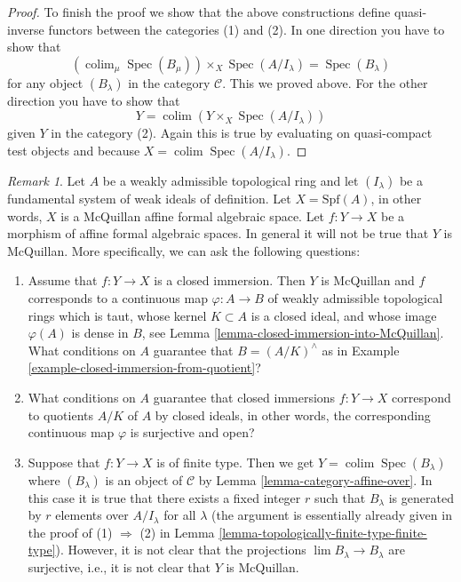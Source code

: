 \documentclass{stacks-project}
\theoremstyle{plain}
\theoremstyle{definition}
\theoremstyle{remark}
\newtheorem{remark}[subsection]{Remark}
\numberwithin{equation}{subsection}
\def\lim{\mathop{\mathrm{lim}}\nolimits}
\def\colim{\mathop{\mathrm{colim}}\nolimits}
\def\Spec{\mathop{\mathrm{Spec}}}
\begin{document}
\begin{proof}
\medskip\noindent
To finish the proof we show that the above constructions
define quasi-inverse functors between the categories (1) and (2).
In one direction you have to show that
$$
\left(\colim_\mu \Spec(B_\mu)\right) \times_X \Spec(A/I_\lambda) =
\Spec(B_\lambda)
$$
for any object $(B_\lambda)$ in the category $\mathcal{C}$.
This we proved above. For
the other direction you have to show that
$$
Y = \colim (Y \times_X \Spec(A/I_\lambda))
$$
given $Y$ in the category (2). Again this is true by evaluating on
quasi-compact test objects and because $X = \colim \Spec(A/I_\lambda)$.
\end{proof}

\begin{remark}
\label{remark-questions}
Let $A$ be a weakly admissible topological ring and let $(I_\lambda)$
be a fundamental system of weak ideals of definition. Let $X = \text{Spf}(A)$,
in other words, $X$ is a McQuillan affine formal algebraic space.
Let $f : Y \to X$ be a morphism of affine formal algebraic spaces.
In general it will not be true that $Y$ is McQuillan. More specifically,
we can ask the following questions:
\begin{enumerate}
\item Assume that $f : Y \to X$ is a closed immersion. Then
$Y$ is McQuillan and $f$ corresponds to a continuous map
$\varphi : A \to B$ of weakly admissible topological rings
which is taut, whose kernel $K \subset A$ is a closed ideal, and
whose image $\varphi(A)$ is dense in $B$, see
Lemma \ref{lemma-closed-immersion-into-McQuillan}.
What conditions on $A$ guarantee that $B = (A/K)^\wedge$ as in
Example \ref{example-closed-immersion-from-quotient}?
\item What conditions on $A$ guarantee that closed immersions
$f : Y \to X$ correspond to quotients $A/K$ of $A$ by closed ideals,
in other words, the corresponding continuous map $\varphi$ is surjective
and open?
\item Suppose that $f : Y \to X$ is of finite type. Then we get
$Y = \colim \Spec(B_\lambda)$ where $(B_\lambda)$ is an object of
$\mathcal{C}$ by Lemma \ref{lemma-category-affine-over}.
In this case it is true that there exists a fixed integer $r$ such
that $B_\lambda$ is generated by $r$ elements over $A/I_\lambda$ for
all $\lambda$ (the argument is essentially already given in the proof of
(1) $\Rightarrow$ (2) in
Lemma \ref{lemma-topologically-finite-type-finite-type}).
However, it is not clear that the projections
$\lim B_\lambda \to B_\lambda$ are surjective, i.e.,
it is not clear that $Y$ is McQuillan.

\end{enumerate}
\end{remark}
\end{document}
